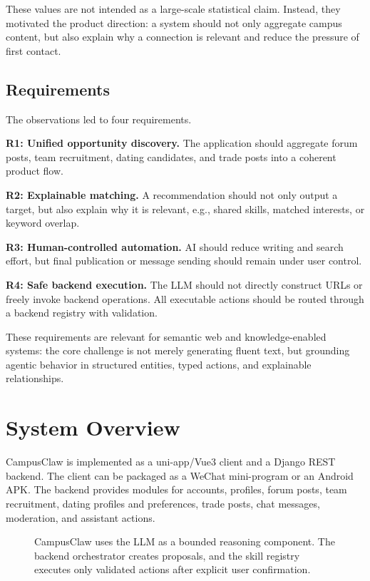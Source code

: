 \documentclass[twocolumn]{article}
\begin{document}
These values are not intended as a large-scale statistical claim. Instead, they motivated the product direction: a system should not only aggregate campus content, but also explain why a connection is relevant and reduce the pressure of first contact.

\subsection{Requirements}
The observations led to four requirements.

\textbf{R1: Unified opportunity discovery.} The application should aggregate forum posts, team recruitment, dating candidates, and trade posts into a coherent product flow.

\textbf{R2: Explainable matching.} A recommendation should not only output a target, but also explain why it is relevant, e.g., shared skills, matched interests, or keyword overlap.

\textbf{R3: Human-controlled automation.} AI should reduce writing and search effort, but final publication or message sending should remain under user control.

\textbf{R4: Safe backend execution.} The LLM should not directly construct URLs or freely invoke backend operations. All executable actions should be routed through a backend registry with validation.

These requirements are relevant for semantic web and knowledge-enabled systems: the core challenge is not merely generating fluent text, but grounding agentic behavior in structured entities, typed actions, and explainable relationships.

\section{System Overview}
CampusClaw is implemented as a uni-app/Vue3 client and a Django REST backend. The client can be packaged as a WeChat mini-program or an Android APK. The backend provides modules for accounts, profiles, forum posts, team recruitment, dating profiles and preferences, trade posts, chat messages, moderation, and assistant actions.

\begin{figure}[t]
\centering
{}
\caption{CampusClaw uses the LLM as a bounded reasoning component. The backend orchestrator creates proposals, and the skill registry executes only validated actions after explicit user confirmation.}
\label{fig:architecture}
\end{figure}
\end{document}
